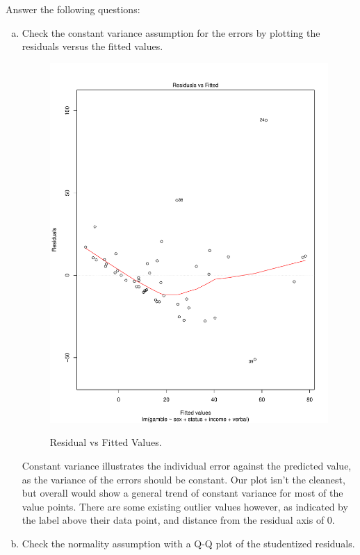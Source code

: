 \documentclass[12pt,letterpaper]{article}
\begin{document}
\vspace{.5cm}
  
\vspace{.5cm}
Answer the following questions:
\vspace{.5cm}
\begin{enumerate}[(a)]
	 \item Check the constant variance assumption for the errors by plotting the residuals versus the fitted values. 
	 
	 \begin{figure}[h!]\centering
	 	\caption{\footnotesize Residual vs Fitted Values.
	 	}\vspace{-1cm}
	 	\label{fig:plot1_a}
	 	\includegraphics[width=.75\textwidth]{resid_fitted_pdf.pdf}\\
	 \end{figure}
	 
Constant variance illustrates the individual error against the predicted value, as the variance of the errors should be constant. Our plot isn't the cleanest, but overall would show a general trend of constant variance for most of the value points. There are some existing outlier values however, as indicated by the label above their data point, and distance from the residual axis of 0. 
	 
	 \newpage
	\item Check the normality assumption with a Q-Q plot of the studentized residuals. \vspace{6cm}


\end{enumerate}
\end{document}
